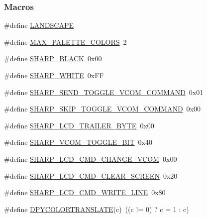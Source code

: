 \subsubsection*{Macros}
\begin{DoxyCompactItemize}
\item 
\#define \hyperlink{_sharp_gr_lib_8h_a211dd160685be8a5a4f43be3fc3195a4}{L\+A\+N\+D\+S\+C\+A\+P\+E}
\item 
\#define \hyperlink{_sharp_gr_lib_8h_adffaead97b78252cbb751cb2dd65b3db}{M\+A\+X\+\_\+\+P\+A\+L\+E\+T\+T\+E\+\_\+\+C\+O\+L\+O\+R\+S}~2
\item 
\#define \hyperlink{_sharp_gr_lib_8h_a700708a7b3391e6ff293b1bc98a71502}{S\+H\+A\+R\+P\+\_\+\+B\+L\+A\+C\+K}~0x00
\item 
\#define \hyperlink{_sharp_gr_lib_8h_a7d13b434a6baf89ac9ac8b34ca7068b4}{S\+H\+A\+R\+P\+\_\+\+W\+H\+I\+T\+E}~0x\+F\+F
\item 
\#define \hyperlink{_sharp_gr_lib_8h_ae2cbee418c123953f828e87e7d635c36}{S\+H\+A\+R\+P\+\_\+\+S\+E\+N\+D\+\_\+\+T\+O\+G\+G\+L\+E\+\_\+\+V\+C\+O\+M\+\_\+\+C\+O\+M\+M\+A\+N\+D}~0x01
\item 
\#define \hyperlink{_sharp_gr_lib_8h_a3047b67f085d1760edf2d6b402ad209a}{S\+H\+A\+R\+P\+\_\+\+S\+K\+I\+P\+\_\+\+T\+O\+G\+G\+L\+E\+\_\+\+V\+C\+O\+M\+\_\+\+C\+O\+M\+M\+A\+N\+D}~0x00
\item 
\#define \hyperlink{_sharp_gr_lib_8h_a1a7f483ad96879e337efe4dad8e1f454}{S\+H\+A\+R\+P\+\_\+\+L\+C\+D\+\_\+\+T\+R\+A\+I\+L\+E\+R\+\_\+\+B\+Y\+T\+E}~0x00
\item 
\#define \hyperlink{_sharp_gr_lib_8h_a30554bd10ddbe85543b0ebb58e4106f5}{S\+H\+A\+R\+P\+\_\+\+V\+C\+O\+M\+\_\+\+T\+O\+G\+G\+L\+E\+\_\+\+B\+I\+T}~0x40
\item 
\#define \hyperlink{_sharp_gr_lib_8h_a954836b459a3be2f0c39bc0b862fcb25}{S\+H\+A\+R\+P\+\_\+\+L\+C\+D\+\_\+\+C\+M\+D\+\_\+\+C\+H\+A\+N\+G\+E\+\_\+\+V\+C\+O\+M}~0x00
\item 
\#define \hyperlink{_sharp_gr_lib_8h_a9e93d5f230739149043a5415ecbea423}{S\+H\+A\+R\+P\+\_\+\+L\+C\+D\+\_\+\+C\+M\+D\+\_\+\+C\+L\+E\+A\+R\+\_\+\+S\+C\+R\+E\+E\+N}~0x20
\item 
\#define \hyperlink{_sharp_gr_lib_8h_a641d27c4086d7240c03b3d05ee1d45a0}{S\+H\+A\+R\+P\+\_\+\+L\+C\+D\+\_\+\+C\+M\+D\+\_\+\+W\+R\+I\+T\+E\+\_\+\+L\+I\+N\+E}~0x80
\item 
\#define \hyperlink{_sharp_gr_lib_8h_a3b4f68242350706cc6e891fecc3399a9}{D\+P\+Y\+C\+O\+L\+O\+R\+T\+R\+A\+N\+S\+L\+A\+T\+E}(c)~((c != 0) ? c = 1 \+: c)
\end{DoxyCompactItemize}
